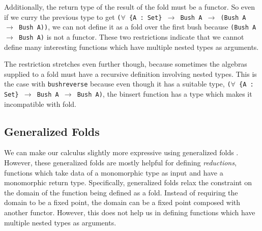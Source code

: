 \documentclass[acmsmall,review,anonymous]{acmart}
\theoremstyle{definition}
\begin{document}
Additionally, the
return type of the result of the fold must be a functor. So even if we curry the previous type to get
\texttt{($\forall$ \{A : Set\} $\to$ Bush A $\to$ (Bush A $\to$ Bush A))}, we can not define it as a fold
over the first bush because \texttt{(Bush A $\to$ Bush A)} is not a functor.
These two restrictions indicate that we cannot define many interesting functions which have
multiple nested types as arguments.

The restriction stretches even further though, because sometimes the algebras supplied to a fold
must have a recursive definition involving nested types. This is the case with \texttt{bushreverse}
because even though it has a suitable type, \texttt{($\forall$ \{A : Set\} $\to$ Bush A $\to$ Bush A)},
the binsert function has a type which makes it incompatible with fold. 

\subsection{Generalized Folds}
We can make our calculus slightly more expressive using generalized folds \cite{?}.
However, these generalized folds are mostly helpful for defining \textit{reductions}, 
functions which take data of a monomorphic type as input and have a monomorphic return type. 
Specifically, generalized folds relax the constraint on the domain of the function being defined as a fold.
Instead of requiring the domain to be a fixed point, the domain can be a fixed point composed with another functor. 
However, this does not help us in defining functions which have multiple nested types as arguments.
\end{document}
